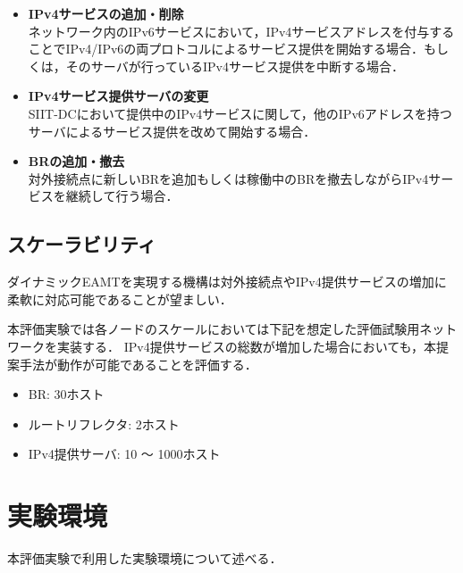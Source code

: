 \begin{itemize}
    \item \textbf{IPv4サービスの追加・削除} \\
    ネットワーク内のIPv6サービスにおいて，IPv4サービスアドレスを付与することでIPv4/IPv6の両プロトコルによるサービス提供を開始する場合．もしくは，そのサーバが行っているIPv4サービス提供を中断する場合．
    \item \textbf{IPv4サービス提供サーバの変更} \\
    SIIT-DCにおいて提供中のIPv4サービスに関して，他のIPv6アドレスを持つサーバによるサービス提供を改めて開始する場合．
    \item \textbf{BRの追加・撤去} \\ 
    対外接続点に新しいBRを追加もしくは稼働中のBRを撤去しながらIPv4サービスを継続して行う場合．
\end{itemize}


\subsection{スケーラビリティ}
\label{evaluation:requirements:scalability}
ダイナミックEAMTを実現する機構は対外接続点やIPv4提供サービスの増加に柔軟に対応可能であることが望ましい．

本評価実験では各ノードのスケールにおいては下記を想定した評価試験用ネットワークを実装する．
IPv4提供サービスの総数が増加した場合においても，本提案手法が動作が可能であることを評価する．

\begin{itemize}
    \item BR: 30ホスト 
    \item ルートリフレクタ: 2ホスト 
    \item IPv4提供サーバ: 10 〜 1000ホスト
\end{itemize}


\section{実験環境}
\label{evaluation:environment}

本評価実験で利用した実験環境について述べる．

